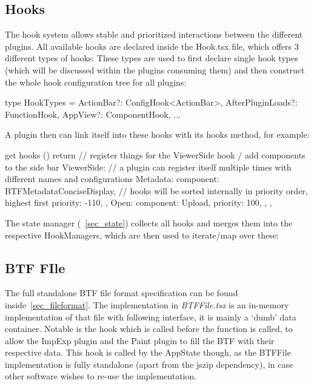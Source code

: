 \subsection{Hooks}\label{sec_hooks}
The hook system allows stable and prioritized interactions between the different
plugins. All available hooks are declared inside the {Hook.tsx} file, which
offers 3 different types of hooks:
These types are used to first declare single hook types (which will be discussed
within the plugins consuming them) and then construct the whole hook
configuration tree for all plugins:
\begin{typescript}
type HookTypes = {
  ActionBar?: ConfigHook<ActionBar>,
  AfterPluginLoads?: FunctionHook,
  AppView?: ComponentHook,
...
}
\end{typescript}
A plugin then can link itself into these hooks with its hooks method, for
example:
\begin{typescript}
get hooks () {
  return {
    // register things for the ViewerSide hook / add components to the side bar
    ViewerSide: {
      // a plugin can register itself multiple times with different names and configurations
      Metadata: {
        component: BTFMetadataConciseDisplay,
        // hooks will be sorted internally in priority order, highest first
        priority: -110,
      },
      Open: {
        component: Upload,
        priority: 100,
      },
    },
  }
}
\end{typescript}
The state manager (~\autoref{sec_state}) collects all hooks and merges them into
the respective HookManagers, which are then used to iterate/map over these:


\subsection{BTF FIle}\label{sec_btffile}
The full standalone BTF file format specification can be found inside~\autoref{sec_fileformat}.
The implementation in \emph{BTFFile.tsx} is an in-memory implementation of that
file with following interface, it is mainly a `dumb' data container.
Notable is the  hook which is called before the
 function is called, to allow the ImpExp plugin and the Paint
plugin to fill the BTF with their respective data. This hook is called by the
AppState though, as the BTFFile implementation is fully standalone (apart from
the jszip dependency), in case other software wishes to re-use the implementation.


